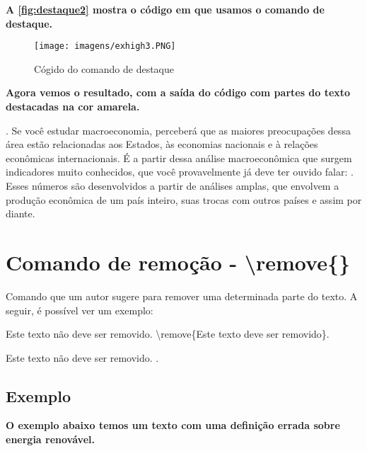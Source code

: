 \documentclass[12pt,openright,oneside,a4paper,sumario=tradicional,brazil]{abntex2}
\begin{document}
\textbf{A \autoref{fig:destaque2} mostra o código em que usamos o comando de destaque.}

\begin{figure}[htp]
\caption{Cógido do comando de destaque}
        \centering
        \texttt{[image: imagens/exhigh3.PNG]}
\label{fig:destaque2}
\end{figure}

\newpage

\textbf{Agora vemos o resultado, com a saída do código com partes do texto destacadas na cor amarela.}

\begin{center}
     \justifying
    . Se você estudar macroeconomia, perceberá que as maiores preocupações dessa área estão relacionadas aos Estados, às economias nacionais e à relações econômicas internacionais. É a partir dessa análise macroeconômica que surgem indicadores muito conhecidos, que você provavelmente já deve ter ouvido falar: . Esses números são desenvolvidos a partir de análises amplas, que envolvem a produção econômica de um país inteiro, suas trocas com outros países e assim por diante.
\end{center}

\section{Comando de remoção - \textbackslash remove\{\}}
Comando que um autor sugere para remover uma determinada parte do texto. A seguir, é possível ver um exemplo:\\

\begin{minipage}{0.45\textwidth}
Este texto não deve ser removido. \textbackslash remove\{Este texto deve ser removido\}.
\end{minipage}\hfill
\begin{minipage}{0.45\textwidth}
Este texto não deve ser removido. .
\end{minipage}

\subsection{Exemplo}

\textbf{O exemplo abaixo temos um texto com uma definição errada sobre energia renovável.}
\end{document}
